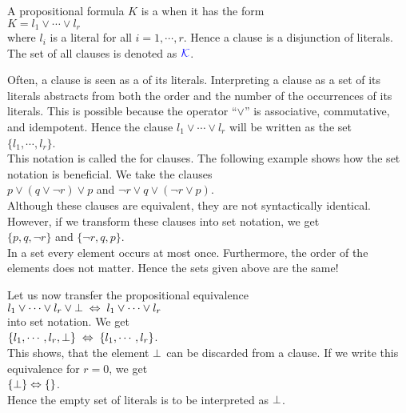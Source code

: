 \begin{Definition}[Clause]
  A propositional formula $K$ is a  when it has the form \\[0.2cm]
  \hspace*{1.3cm} $K = l_1 \vee \cdots \vee l_r$ \\[0.2cm]
  where $l_i$ is a literal for all $i=1,\cdots,r$.  Hence a clause is a disjunction of literals.
  The set of all clauses is denoted as  ${\color{blue}\mathcal{K}}$.
  \eox
\end{Definition}

Often, a clause is seen as a  of its literals.  Interpreting a clause as a set of its literals
abstracts from both the order and the number of the occurrences of its literals.
This is possible because the operator ``$\vee$'' is associative, commutative, and idempotent.  
Hence the clause  $l_1 \vee \cdots \vee l_r$ will be written as the set
\\[0.2cm]
\hspace*{1.3cm} $\{ l_1, \cdots, l_r \}$.
\\[0.2cm]
This notation is called the  for clauses.  
The following example shows how the set notation is beneficial.  We take the clauses
\\[0.2cm]
\hspace*{1.3cm}
$p \vee (q \vee \neg r) \vee p$ \quad and \quad $\neg r \vee q \vee (\neg r \vee p)$. 
\\[0.2cm]
Although these clauses are equivalent, they are not syntactically identical.  However, if we transform these
clauses into set notation, we get
\\[0.2cm]
\hspace*{1.3cm}
$\{p, q, \neg r \}$ \quad and \quad $\{ \neg r, q, p \}$. 
\\[0.2cm]
In a set every element occurs at most once.  Furthermore, the order of the elements does not matter.
Hence the sets given above are the same!

Let us now transfer the propositional equivalence
\\[0.2cm]
\hspace*{1.3cm}
$l_1 \vee \cdots \vee l_r \vee \bot \;\Leftrightarrow\; l_1 \vee \cdots \vee l_r$
\\[0.2cm]
into set notation.  We get
\\[0.2cm]
\hspace*{1.3cm}
$\{ l_1, \cdots, l_r, \bot \} \;\Leftrightarrow\; \{ l_1, \cdots, l_r \}$.
\\[0.2cm]
This shows, that the element $\bot$ can be discarded from a clause.  If we write this equivalence for $r=0$,
we get
\\[0.2cm]
\hspace*{1.3cm}
$\{\bot \} \Leftrightarrow \{\}$.
\\[0.2cm]
Hence the empty set of literals is to be interpreted as $\bot$.

